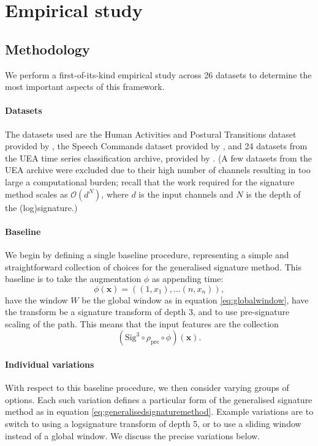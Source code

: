 \documentclass{article}
\theoremstyle{definition}
\theoremstyle{remark}
\newcommand{\bigO}{\mathcal{O}}
\begin{document}
	\section{Empirical study}
	\label{sec:empirical_study}
	
	\subsection{Methodology}
	We perform a first-of-its-kind empirical study across 26 datasets to determine the most important aspects of this framework.
	
	\paragraph{Datasets} The datasets used are the Human Activities and Postural Transitions dataset provided by \citet{reyes2016transition}, the Speech Commands dataset provided by \citet{warden2018speech}, and 24 datasets from the UEA time series classification archive, provided by \citet{bagnall2018uea}. (A few datasets from the UEA archive were excluded due to their high number of channels resulting in too large a computational burden; recall that the work required for the signature method scales as $\bigO(d^N)$, where $d$ is the input channels and $N$ is the depth of the (log)signature.)
	
	\paragraph{Baseline} We begin by defining a single baseline procedure, representing a simple and straightforward collection of choices for the generalised signature method. This baseline is to take the augmentation $\phi$ as appending time:
	\begin{equation*}
	\phi(\mathbf{x}) = ( (1,x_1), \dots (n,x_n) ),
	\end{equation*}
	have the window $W$ be the global window as in equation \eqref{eq:globalwindow}, have the transform be a signature transform of depth $3$, and to use pre-signature scaling of the path. This means that the input features are the collection
	\begin{equation*}
	\left(\mathrm{Sig}^3 \circ \rho_{\mathrm{pre}}\circ \phi \right)(\mathbf{x}).
	\end{equation*}
	
	\paragraph{Individual variations} With respect to this baseline procedure, we then consider varying groups of options. Each such variation defines a particular form of the generalised signature method as in equation \eqref{eq:generalisedsignaturemethod}. Example variations are to switch to using a logsignature transform of depth 5, or to use a sliding window instead of a global window. We discuss the precise variations below.
	
\end{document}
